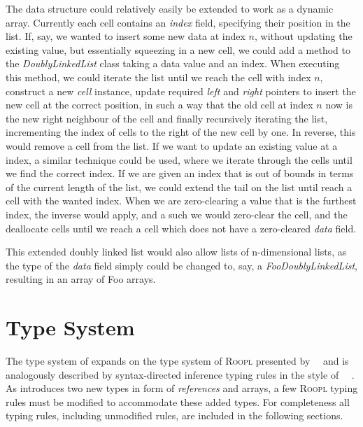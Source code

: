 The data structure could relatively easily be extended to work as a dynamic array. Currently each cell contains an \textit{index} field, specifying their position in the list. If, say, we wanted to insert some new data at index $n$, without updating the existing value, but essentially squeezing in a new cell, we could add a method to the \textit{DoublyLinkedList} class taking a data value and an index. When executing this method, we could iterate the list until we reach the cell with index $n$, construct a new \textit{cell} instance, update required \textit{left} and \textit{right} pointers to insert the new cell at the correct position, in such a way that the old cell at index $n$ now is the new right neighbour of the cell and finally recursively iterating the list, incrementing the index of cells to the right of the new cell by one. In reverse, this would remove a cell from the list. If we want to update an existing value at a index, a similar technique could be used, where we iterate through the cells until we find the correct index. If we are given an index that is out of bounds in terms of the current length of the list, we could extend the tail on the list until reach a cell with the wanted index. When we are zero-clearing a value that is the furthest index, the inverse would apply, and a such we would zero-clear the cell, and the deallocate cells until we reach a cell which does not have a zero-cleared \textit{data} field. 

This extended doubly linked list would also allow lists of n-dimensional lists, as the type of the \textit{data} field simply could be changed to, say, a \textit{FooDoublyLinkedList}, resulting in an array of Foo arrays. 
\newpage


\section{Type System}
\label{sec:type-system}
The type system of \rooplpp expands on the type system of \textsc{Roopl} presented by~\citeauthor{th:roopl}~\cite{th:roopl} and is analogously described by syntax-directed inference typing rules in the style of ~\citeauthor{wi:semantics}~\cite{wi:semantics}. As \rooplpp introduces two new types in form of \textit{references} and arrays, a few \textsc{Roopl} typing rules must be modified to accommodate these added types. For completeness all typing rules, including unmodified rules, are included in the following sections. 

